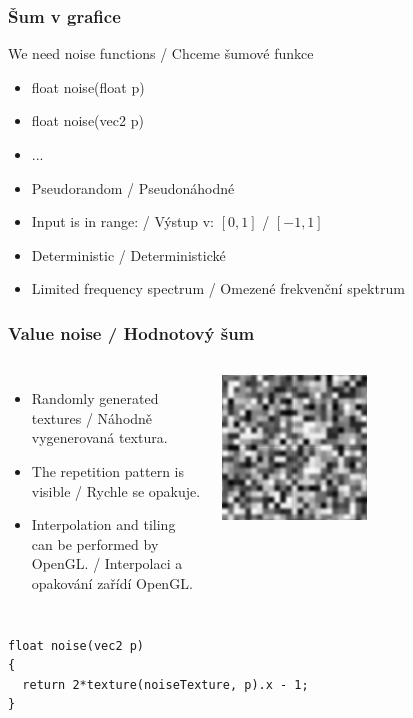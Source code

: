 \begin{frame}\frametitle{Šum v grafice}
We need noise functions / Chceme šumové funkce
\begin{itemize}
  \item float noise(float p)
  \item float noise(vec2 p)
  \item ...
\end{itemize}
\vfill
\begin{itemize}
   \item Pseudorandom / Pseudonáhodné
   \item Input is in range: / Výstup v: $[0,1]$ / $[-1,1]$
   \item Deterministic / Deterministické
   \item Limited frequency spectrum / Omezené frekvenční spektrum
\end{itemize}
\end{frame}

\begin{frame}[fragile]\frametitle{Value noise / Hodnotový šum}\scriptsize
\begin{columns}[c]
  \begin{itemize}
      \item Randomly generated textures / Náhodně vygenerovaná textura.
      \item The repetition pattern is visible / Rychle se opakuje.
      \item Interpolation and tiling can be performed by OpenGL. / Interpolaci a opakování zařídí OpenGL.
  \end{itemize}
  \includegraphics[width=0.5\textwidth]{pics/procedural/value_noise.eps}
\end{columns}

\begin{verbatim}
float noise(vec2 p)
{
  return 2*texture(noiseTexture, p).x - 1;
}
\end{verbatim}
\end{frame}

